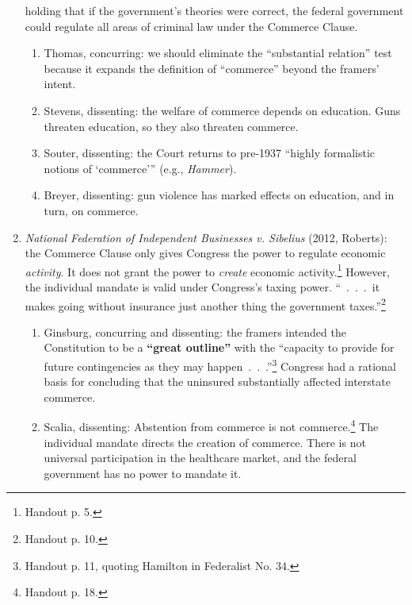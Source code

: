 \begin{enumerate}
    holding that if the government's theories were correct, the federal 
    government could regulate all areas of criminal law under the Commerce 
    Clause.
    \begin{enumerate}
        \item Thomas, concurring: we should eliminate the ``substantial 
        relation'' test because it expands the definition of ``commerce'' 
        beyond the framers' intent.
        \item Stevens, dissenting: the welfare of commerce depends on 
        education. Guns threaten education, so they also threaten commerce.
        \item Souter, dissenting: the Court returns to pre-1937 \enquote{highly 
        formalistic notions of \enquote{commerce}} (e.g., \emph{Hammer}).
        \item Breyer, dissenting: gun violence has marked effects on 
        education, and in turn, on commerce.
    \end{enumerate}
    \item \emph{National Federation of Independent Businesses v. Sibelius} 
    (2012, Roberts): the Commerce Clause only gives Congress the power to 
    regulate economic \emph{activity}. It does not grant the power to 
    \emph{create} economic activity.\footnote{Handout p. 5.} However, the 
    individual mandate is valid under Congress's taxing power. ``~.~.~.~it 
    makes going without insurance just another thing the government 
    taxes.''\footnote{Handout p. 10.}
    \begin{enumerate}
        \item Ginsburg, concurring and  dissenting: the framers intended the 
        Constitution to be a \textbf{``great outline''} with the ``capacity to 
        provide for future contingencies as they may 
        happen~.~.~.''\footnote{Handout p.  11, quoting Hamilton in Federalist 
        No. 34.} Congress had a rational basis for concluding that the 
        uninsured substantially affected interstate commerce.
        \item Scalia, dissenting: Abstention from commerce is not 
        commerce.\footnote{Handout p.  18.} The individual mandate directs the 
        creation of commerce. There is not universal participation in the 
        healthcare market, and the federal government has no power to mandate 
        it.
    \end{enumerate}
\end{enumerate}


